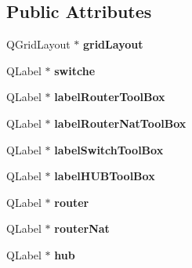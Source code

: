\subsection*{Public Attributes}
\begin{DoxyCompactItemize}
\item 
\hypertarget{class_ui___tool_box_a619af750bc9cba4ffdd50901888f8a09}{Q\-Grid\-Layout $\ast$ {\bfseries grid\-Layout}}\label{class_ui___tool_box_a619af750bc9cba4ffdd50901888f8a09}

\item 
\hypertarget{class_ui___tool_box_a6291d641635b03326bfe7cb196c29fb8}{Q\-Label $\ast$ {\bfseries switche}}\label{class_ui___tool_box_a6291d641635b03326bfe7cb196c29fb8}

\item 
\hypertarget{class_ui___tool_box_a4ed46e12dea74afad1eea573ccfc8fd0}{Q\-Label $\ast$ {\bfseries label\-Router\-Tool\-Box}}\label{class_ui___tool_box_a4ed46e12dea74afad1eea573ccfc8fd0}

\item 
\hypertarget{class_ui___tool_box_a46c06a9dc2c03631d79cd5ecdf31f463}{Q\-Label $\ast$ {\bfseries label\-Router\-Nat\-Tool\-Box}}\label{class_ui___tool_box_a46c06a9dc2c03631d79cd5ecdf31f463}

\item 
\hypertarget{class_ui___tool_box_a6f758ca06ad144ab1b2ec840499f6aff}{Q\-Label $\ast$ {\bfseries label\-Switch\-Tool\-Box}}\label{class_ui___tool_box_a6f758ca06ad144ab1b2ec840499f6aff}

\item 
\hypertarget{class_ui___tool_box_a85472d38b7eedafabcfb0c0f0b522d06}{Q\-Label $\ast$ {\bfseries label\-H\-U\-B\-Tool\-Box}}\label{class_ui___tool_box_a85472d38b7eedafabcfb0c0f0b522d06}

\item 
\hypertarget{class_ui___tool_box_a988a57acdc1cbdd0a9b3a416572b707c}{Q\-Label $\ast$ {\bfseries router}}\label{class_ui___tool_box_a988a57acdc1cbdd0a9b3a416572b707c}

\item 
\hypertarget{class_ui___tool_box_a9ace16509841aa8864f273d091b7adca}{Q\-Label $\ast$ {\bfseries router\-Nat}}\label{class_ui___tool_box_a9ace16509841aa8864f273d091b7adca}

\item 
\hypertarget{class_ui___tool_box_a15d7f999ef86792b84c6b1cd7597be5f}{Q\-Label $\ast$ {\bfseries hub}}\label{class_ui___tool_box_a15d7f999ef86792b84c6b1cd7597be5f}


\end{DoxyCompactItemize}
